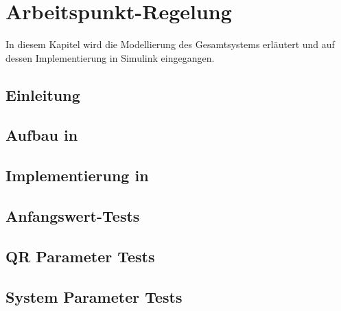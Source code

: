 \chapter{Arbeitspunkt-Regelung}\label{cha:apr}

In diesem Kapitel wird die Modellierung des Gesamtsystems erläutert und auf dessen Implementierung in Simulink eingegangen.

\section{Einleitung}%



\section{Aufbau in \Simulink}



\section{Implementierung in \Matlab}



\section{Anfangswert-Tests}



\section{QR Parameter Tests}



\section{System Parameter Tests}



